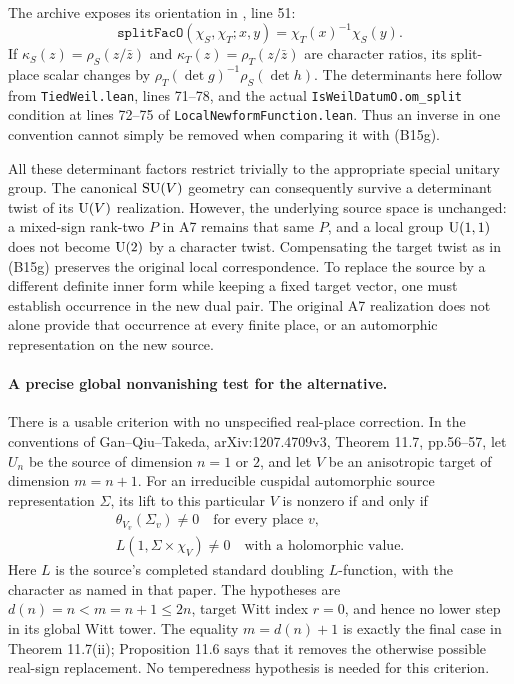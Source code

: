 \documentclass[11pt]{article}
\theoremstyle{definition}\newtheorem{definition}[theorem]{Definition}\newtheorem{remark}[theorem]{Remark}
\begin{document}
The archive exposes its orientation in
, line 51:
\[
 \texttt{splitFacO}(\chi_S,\chi_T;x,y)=\chi_T(x)^{-1}\chi_S(y).
 \tag{B15h}
\]
If $\kappa_S(z)=\rho_S(z/\bar z)$ and $\kappa_T(z)=\rho_T(z/\bar z)$ are character ratios, its split-place scalar changes by
$\rho_T(\det g)^{-1}\rho_S(\det h)$.
The determinants here follow from \texttt{TiedWeil.lean}, lines 71--78, and the actual \nolinkurl{IsWeilDatumO.om_split} condition at lines 72--75 of \nolinkurl{LocalNewformFunction.lean}. Thus an inverse in one convention cannot simply be removed when comparing it with (B15g).

All these determinant factors restrict trivially to the appropriate special unitary group. The canonical $\operatorname{SU}(V)$ geometry can consequently survive a determinant twist of its $\operatorname{U}(V)$ realization. However, the underlying source space is unchanged: a mixed-sign rank-two $P$ in A7 remains that same $P$, and a local group $\operatorname{U}(1,1)$ does not become $\operatorname{U}(2)$ by a character twist. Compensating the target twist as in (B15g) preserves the original local correspondence. To replace the source by a different definite inner form while keeping a fixed target vector, one must establish occurrence in the new dual pair. The original A7 realization does not alone provide that occurrence at every finite place, or an automorphic representation on the new source.

\paragraph{A precise global nonvanishing test for the alternative.}
There is a usable criterion with no unspecified real-place correction. In the conventions of Gan--Qiu--Takeda, arXiv:1207.4709v3, Theorem 11.7, pp.56--57, let $U_n$ be the source of dimension $n=1$ or $2$, and let $V$ be an anisotropic target of dimension $m=n+1$. For an irreducible cuspidal automorphic source representation $\Sigma$, its lift to this particular $V$ is nonzero if and only if
\begin{equation}
\begin{gathered}
 \theta_{V_v}(\Sigma_v)\ne0\quad\text{for every place }v,
 \\ L(1,\Sigma\times\chi_V)\ne0
       \quad\text{with a holomorphic value}.
\end{gathered}
 \tag{B15i}
\end{equation}
Here $L$ is the source's completed standard doubling $L$-function, with the character as named in that paper. The hypotheses are $d(n)=n<m=n+1\leq2n$, target Witt index $r=0$, and hence no lower step in its global Witt tower. The equality $m=d(n)+1$ is exactly the final case in Theorem 11.7(ii); Proposition 11.6 says that it removes the otherwise possible real-sign replacement. No temperedness hypothesis is needed for this criterion.
\end{document}
